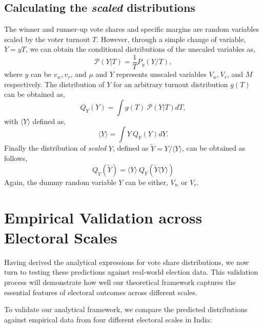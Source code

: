 \subsection{Calculating the \emph{scaled} distributions}
\noindent The winner and runner-up vote shares and specific margins are random variables scaled by the voter turnout $T$. However, through a simple change of variable, $Y = yT$, we can obtain the conditional distributions of the unscaled variables as,
\begin{equation}
    \mathcal{P}\left(Y|T\right) = \frac{1}{T}P_y\left(Y / T \right),
\end{equation}
where $y$ can be $v_w, v_r$, and $\mu$ and $Y$ represents unscaled variables  $V_w, V_r$, and $M$ respectively. The distribution of $Y$ for an arbitrary turnout distribution $g(T)$ can be obtained as,
\begin{equation}
    Q_Y(Y) = \int g(T) ~ \mathcal{P}(Y|T)dT, 
    \label{eq:QY}
\end{equation}
with $\langle Y\rangle$ defined as,
\begin{equation}
    \langle Y \rangle = \int Y ~ Q_Y(Y)dY.
\end{equation}
\noindent Finally the distribution of \emph{scaled} $Y$, defined as $\widetilde{Y} = Y / \langle Y \rangle$, can be obtained as follows,
\begin{equation}
    {Q}_{\widetilde{Y}}(\widetilde{Y}) =  \langle Y \rangle ~ Q_{Y}(\widetilde{Y}  \langle Y \rangle)
    \label{eq:QYscaled}
\end{equation}
\noindent Again, the dummy random variable $Y$ can be either, $V_w$ or $V_r$.
\section{Empirical Validation across Electoral Scales}
Having derived the analytical expressions for vote share distributions, we now turn to testing these predictions against real-world election data. This validation process will demonstrate how well our theoretical framework captures the essential features of electoral outcomes across different scales.

To validate our analytical framework, we compare the predicted distributions against empirical data from four different electoral scales in India:

